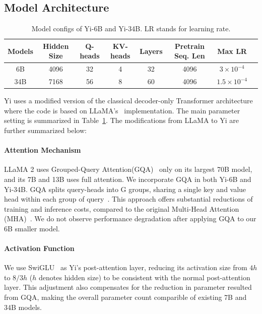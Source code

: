 \documentclass[numbers,sort&compress]{article}
\begin{document}
\subsection{Model Architecture}
\begin{table}[t!]
    \centering
    \begin{tabular}{@{}cccccccc@{}}
        \toprule
         Models&  Hidden Size&  Q-heads&  KV-heads&  Layers&  Pretrain Seq. Len& Max LR\\
         \midrule
         6B&  4096&  32&  4&  32&  4096& $3\times10^{-4}$\\
         34B&  7168&  56&  8&  60&  4096& $1.5\times10^{-4}$\\
         \bottomrule
    \end{tabular}
    \space
    \caption{Model configs of Yi-6B and Yi-34B. LR stands for learning rate.}
    \label{tab:model_config}
\end{table}
Yi uses a modified version of the classical decoder-only Transformer architecture~\citep{Vaswani:2017aa} where the code is based on LLaMA's~\citep{llama2} implementation. 
The main parameter setting is summarized in Table~\ref{tab:model_config}. 
The modifications from LLaMA to Yi are further summarized below:

\paragraph{Attention Mechanism} LLaMA 2 uses Grouped-Query Attention(GQA)~\citep{gqa} only on its largest 70B model, and its 7B and 13B uses full attention. We incorporate GQA in both Yi-6B and Yi-34B. 
GQA splits query-heads into G groups, sharing a single key and value head within each group of query~\citep{gqa}.
This approach offers substantial reductions of training and inference costs, compared to the original Multi-Head Attention (MHA)~\citep{shazeer2019fast,de2022fido,pope2023efficiently}.
We do not observe performance degradation after applying GQA to our 6B smaller model. 

\paragraph{Activation Function} 
We use SwiGLU~\citep{swiglu} as Yi's post-attention layer, reducing its activation size from $4h$ to $8/3h$ ($h$ denotes hidden size) to be consistent with the normal post-attention layer. 
This adjustment also compensates for the reduction in parameter resulted from GQA, making the overall parameter count comparible of existing 7B and 34B models. 
\end{document}
